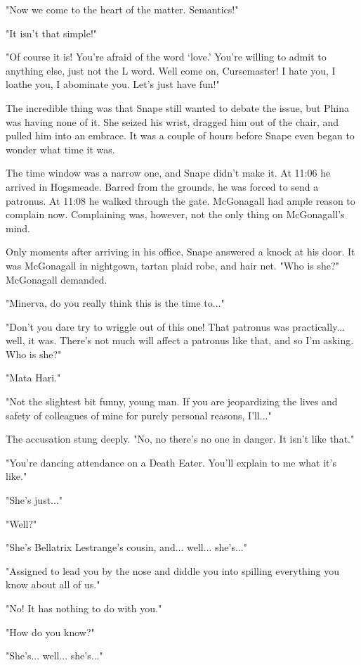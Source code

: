 "Now we come to the heart of the matter. Semantics!"

"It isn't that simple!"

"Of course it is! You're afraid of the word `love.' You're willing to admit to anything else, just not the L word. Well come on, Cursemaster! I hate you, I loathe you, I abominate you. Let's just have fun!"

The incredible thing was that Snape still wanted to debate the issue, but Phina was having none of it. She seized his wrist, dragged him out of the chair, and pulled him into an embrace. It was a couple of hours before Snape even began to wonder what time it was.

The time window was a narrow one, and Snape didn't make it. At 11:06 he arrived in Hogsmeade. Barred from the grounds, he was forced to send a patronus. At 11:08 he walked through the gate. McGonagall had ample reason to complain now. Complaining was, however, not the only thing on McGonagall's mind.

Only moments after arriving in his office, Snape answered a knock at his door. It was McGonagall in nightgown, tartan plaid robe, and hair net. "Who is she?" McGonagall demanded.

"Minerva, do you really think this is the time to..."

"Don't you dare try to wriggle out of this one! That patronus was practically... well, it was. There's not much will affect a patronus like that, and so I'm asking. Who is she?"

"Mata Hari."

"Not the slightest bit funny, young man. If you are jeopardizing the lives and safety of colleagues of mine for purely personal reasons, I'll..."

The accusation stung deeply. "No, no there's no one in danger. It isn't like that."

"You're dancing attendance on a Death Eater. You'll explain to me what it's like."

"She's just..."

"Well?"

"She's Bellatrix Lestrange's cousin, and... well... she's..."

"Assigned to lead you by the nose and diddle you into spilling everything you know about all of us."

"No! It has nothing to do with you."

"How do you know?"

"She's... well... she's..."

